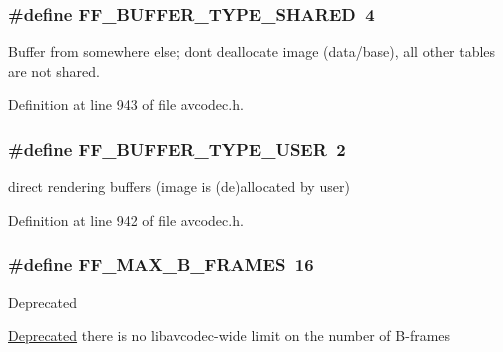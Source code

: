 \subsubsection[{\texorpdfstring{F\+F\+\_\+\+B\+U\+F\+F\+E\+R\+\_\+\+T\+Y\+P\+E\+\_\+\+S\+H\+A\+R\+ED}{FF_BUFFER_TYPE_SHARED}}]{\setlength{\rightskip}{0pt plus 5cm}\#define F\+F\+\_\+\+B\+U\+F\+F\+E\+R\+\_\+\+T\+Y\+P\+E\+\_\+\+S\+H\+A\+R\+ED~4}\hypertarget{group__lavc__core_ga030a04dab5312d7c838441c37dfac0a3}{}\label{group__lavc__core_ga030a04dab5312d7c838441c37dfac0a3}


Buffer from somewhere else; don\textquotesingle{}t deallocate image (data/base), all other tables are not shared. 



Definition at line 943 of file avcodec.\+h.

\subsubsection[{\texorpdfstring{F\+F\+\_\+\+B\+U\+F\+F\+E\+R\+\_\+\+T\+Y\+P\+E\+\_\+\+U\+S\+ER}{FF_BUFFER_TYPE_USER}}]{\setlength{\rightskip}{0pt plus 5cm}\#define F\+F\+\_\+\+B\+U\+F\+F\+E\+R\+\_\+\+T\+Y\+P\+E\+\_\+\+U\+S\+ER~2}\hypertarget{group__lavc__core_gae1c5683bff1273858cdfa48026df8146}{}\label{group__lavc__core_gae1c5683bff1273858cdfa48026df8146}


direct rendering buffers (image is (de)allocated by user) 



Definition at line 942 of file avcodec.\+h.

\subsubsection[{\texorpdfstring{F\+F\+\_\+\+M\+A\+X\+\_\+\+B\+\_\+\+F\+R\+A\+M\+ES}{FF_MAX_B_FRAMES}}]{\setlength{\rightskip}{0pt plus 5cm}\#define F\+F\+\_\+\+M\+A\+X\+\_\+\+B\+\_\+\+F\+R\+A\+M\+ES~16}\hypertarget{group__lavc__core_gafe5eaf646b3390c6ae8a7a66cd4b7896}{}\label{group__lavc__core_gafe5eaf646b3390c6ae8a7a66cd4b7896}
\begin{DoxyRefDesc}{Deprecated}
\item[\hyperlink{deprecated__deprecated000001}{Deprecated}]there is no libavcodec-\/wide limit on the number of B-\/frames \end{DoxyRefDesc}


